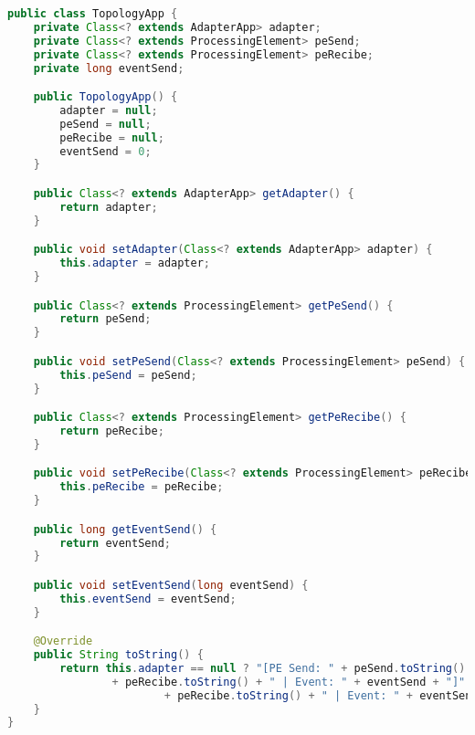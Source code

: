 \begin{lstlisting}[caption={Clase TopologyApp, el cual contiene las topolog\'ia del grafo dise\~nado por el usuario.},label={lst:topologyApp},language=Java]
public class TopologyApp {
	private Class<? extends AdapterApp> adapter;
	private Class<? extends ProcessingElement> peSend;
	private Class<? extends ProcessingElement> peRecibe;
	private long eventSend;

	public TopologyApp() {
		adapter = null;
		peSend = null;
		peRecibe = null;
		eventSend = 0;
	}

	public Class<? extends AdapterApp> getAdapter() {
		return adapter;
	}

	public void setAdapter(Class<? extends AdapterApp> adapter) {
		this.adapter = adapter;
	}

	public Class<? extends ProcessingElement> getPeSend() {
		return peSend;
	}

	public void setPeSend(Class<? extends ProcessingElement> peSend) {
		this.peSend = peSend;
	}

	public Class<? extends ProcessingElement> getPeRecibe() {
		return peRecibe;
	}

	public void setPeRecibe(Class<? extends ProcessingElement> peRecibe) {
		this.peRecibe = peRecibe;
	}

	public long getEventSend() {
		return eventSend;
	}

	public void setEventSend(long eventSend) {
		this.eventSend = eventSend;
	}

	@Override
	public String toString() {
		return this.adapter == null ? "[PE Send: " + peSend.toString() + " | PE Recibe: "
				+ peRecibe.toString() + " | Event: " + eventSend + "]" : "[Adapter: " + adapter.toString() + " | PE Recibe: "
						+ peRecibe.toString() + " | Event: " + eventSend + "]";
	}
}
\end{lstlisting}